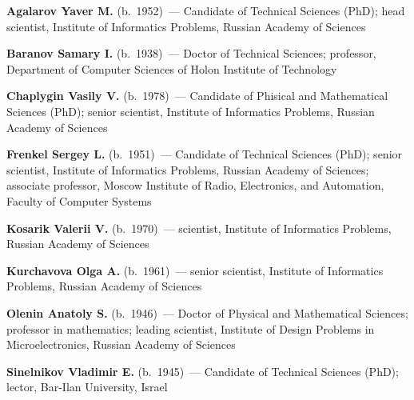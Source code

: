 \begin{multicols}{2}

\noindent
\textbf{Agalarov Yaver M.} (b.\ 1952)~--- Candidate of Technical Sciences (PhD); head scientist,
Institute of Informatics
Problems, Russian Academy of Sciences


\vspace*{8pt}

\noindent
\textbf{Baranov Samary I.} (b.\ 1938)~--- Doctor of Technical Sciences;
professor, Department of Computer Sciences of Holon Institute of Technology
{ %

}

\vspace*{8pt}

\noindent
\textbf{Chaplygin Vasily V.} (b.\ 1978)~--- 
Candidate of
Phisical and Mathematical Sciences (PhD); 
senior scientist, Institute of Informatics
Problems, Russian Academy of Sciences


\vspace*{8pt}

\noindent
\textbf{Frenkel Sergey L.} (b.\ 1951)~--- Candidate of Technical Sciences (PhD);
senior scientist, Institute of Informatics Problems,
Russian Academy of Sciences; associate professor, Moscow Institute of
Radio, Electronics, and Automation, Faculty of Computer Systems

\vspace*{8pt}

\noindent
\textbf{Kosarik Valerii V.} (b.\ 1970)~--- scientist, Institute
of Informatics Problems, Russian Academy of Sciences

\vspace*{8pt}

\noindent
\textbf{Kurchavova Olga  A.} (b.\ 1961)~--- senior scientist,
Institute of Informatics Problems, Russian Academy of Sciences


\noindent
\textbf{Olenin Anatoly S.} (b.\ 1946)~--- Doctor of Physical and Mathematical
Sciences; professor in mathematics; leading scientist,
Institute of Design Problems in Microelectronics, Russian Academy of Sciences
{ %

}

\vspace*{6pt}

\noindent
\textbf{Sinelnikov Vladimir E.} (b.\ 1945)~--- Candidate of Technical Sciences (PhD);
lector, Bar-Ilan University, Israel


\end{multicols}
